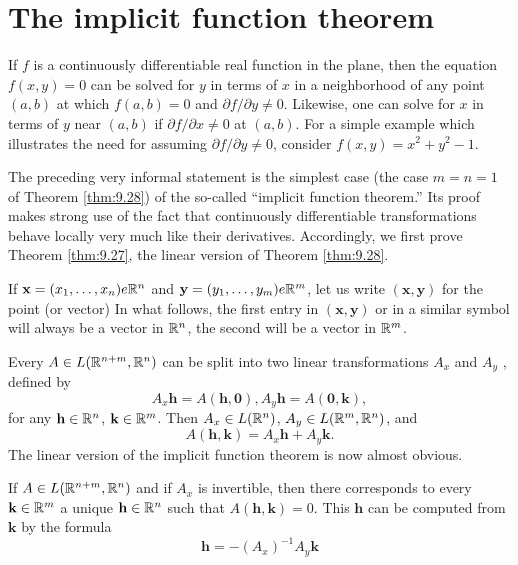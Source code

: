 \section{The implicit function theorem}

If $f$ is a continuously differentiable real function in the plane, 
then the equation
$f(x, y) = 0$ can be solved for $y$ in terms of $x$ in a neighborhood of any point 
$(a, b)$ at which $f(a, b) = 0$ and $\partial f/ \partial y \neq 0$. 
Likewise, one can solve for $x$ in terms
of $y$ near $(a, b)$ if $\partial f/ \partial x \neq 0$ at $(a, b)$. 
For a simple example which illustrates
the need for assuming $\partial f/ \partial y \neq 0$, 
consider $f(x, y) = x^2 + y^2 - 1$.

The preceding very informal statement is the simplest case 
(the case $m = n = 1$ of Theorem \ref{thm:9.28})
of the so-called ``implicit function theorem.''
Its proof makes strong use of the fact that continuously differentiable 
transformations behave locally very much like their derivatives. 
Accordingly, we first prove
Theorem \ref{thm:9.27}, the linear version of Theorem \ref{thm:9.28}.

\begin{myNotation}
    If  $\mathbf{x} = (x_1 , \dots , x_n) e {\protect\mathbb R}^n$ 
    and $\mathbf{y} = (y_1 , \dots , y_m) e {\protect\mathbb R}^m$, 
    let us write $\mathbf{(x, y)}$ for the point (or vector) 
    In what follows, 
    the first entry in $\mathbf{(x, y)}$ or in a similar symbol will always be a
    vector in ${\protect\mathbb R}^n$, the second will be a vector in ${\protect\mathbb R}^m$.
    
    Every $A \in L({\protect\mathbb R}^{n+m}, {\protect\mathbb R}^n)$ can be split into two linear transformations 
    $A_x$ and $A_y$ , defined by
    \begin{equation}
        \label{eq:9.53}
        A_x \mathbf{h} = A \mathbf{(h, 0)},
        A_y \mathbf{h} = A \mathbf{(0, k)},
    \end{equation}
    for any $\mathbf{h} \in {\protect\mathbb R}^n$, $\mathbf{k} \in {\protect\mathbb R}^m$. 
    Then $A_x \in L({\protect\mathbb R}^n)$, $A_y \in L({\protect\mathbb R}^m, {\protect\mathbb R}^n)$, 
    and
    \begin{equation}
        \label{eq:9.54}
        A(\mathbf{h, k}) = A_x \mathbf{h} + A_y \mathbf{k}.
    \end{equation}
    The linear version of the implicit function theorem is now almost obvious.
\end{myNotation}

\begin{thm}
    \label{thm:9.27}
    If $A \in L({\protect\mathbb R}^{n+m}, {\protect\mathbb R}^n)$ 
    and if $A_x$ is invertible, 
    then there corresponds to every $\mathbf{k} \in {\protect\mathbb R}^m$ 
    a unique $\mathbf{h} \in {\protect\mathbb R}^n$ such that $A(\mathbf{h, k}) = 0$.
    This $\mathbf{h}$ can be computed from $\mathbf{k}$ by the formula
    \begin{equation}
        \label{eq:9.55}
        \mathbf{h} = -(A_x)^{-1} A_y \mathbf{k}
    \end{equation}
\end{thm}

